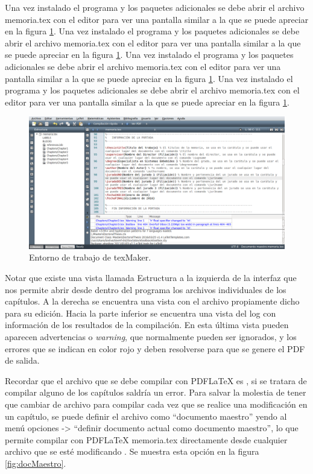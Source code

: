 Una vez instalado el programa y los paquetes adicionales se debe abrir el archivo memoria.tex con el editor para ver una pantalla similar a la que se puede apreciar en la figura \ref{fig:texmaker}. 
Una vez instalado el programa y los paquetes adicionales se debe abrir el archivo memoria.tex con el editor para ver una pantalla similar a la que se puede apreciar en la figura \ref{fig:texmaker}. 
Una vez instalado el programa y los paquetes adicionales se debe abrir el archivo memoria.tex con el editor para ver una pantalla similar a la que se puede apreciar en la figura \ref{fig:texmaker}. 
Una vez instalado el programa y los paquetes adicionales se debe abrir el archivo memoria.tex con el editor para ver una pantalla similar a la que se puede apreciar en la figura \ref{fig:texmaker}. 

\vspace{1cm}

\begin{figure}[htbp]
	\centering
	\includegraphics[width=.5\textwidth]{./Figures/texmaker.png}
	\caption{Entorno de trabajo de texMaker.}
	\label{fig:texmaker}
\end{figure}

\vspace{1cm}

Notar que existe una vista llamada Estructura a la izquierda de la interfaz que nos permite abrir desde dentro del programa los archivos individuales de los capítulos.  A la derecha se encuentra una vista con el archivo propiamente dicho para su edición. Hacia la parte inferior se encuentra una vista del log con información de los resultados de la compilación.  En esta última vista pueden aparecen advertencias o \textit{warning}, que normalmente pueden ser ignorados, y los errores que se indican en color rojo y deben resolverse para que se genere el PDF de salida.

Recordar que el archivo que se debe compilar con PDFLaTeX es , si se tratara de compilar alguno de los capítulos saldría un error.  Para salvar la molestia de tener que cambiar de archivo para compilar cada vez que se realice una modificación en un capítulo, se puede definir el archivo  como ``documento maestro'' yendo al menú opciones -> ``definir documento actual como documento maestro'', lo que permite compilar con PDFLaTeX memoria.tex directamente desde cualquier archivo que se esté modificando . Se muestra esta opción en la figura \ref{fig:docMaestro}.

